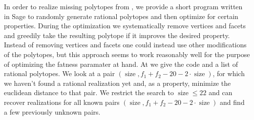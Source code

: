 \documentclass[11pt]{article}
\newcommand{\size}{\operatorname{size}}
\begin{document}
In order to realize missing polytopes from \cite[Figure 3]{BZ18}, we provide a short program written in Sage \cite{SageMath} to randomly generate rational polytopes and then optimize for certain properties. During the optimization we systematically remove vertices and facets and greedily take the resulting polytope if it improves the desired property. Instead of removing vertices and facets one could instead use other modifications of the polytopes, but this approach seems to work reasonably well for the purpose of optimizing the fatness paramater at hand. At \cite{F21} we give the code and a list of rational polytopes.  We look at a pair $(\size, f_1 + f_2 - 20 - 2\cdot \size)$, for which we haven't found a rational realization yet and, as a property, minimize the euclidean distance to that pair. We restrict the search to $\size \leq 22$ and can recover realizations for all known pairs $(\size, f_1 + f_2 - 20 - 2\cdot \size)$ and find a few previously unknown pairs. 


\end{document}

